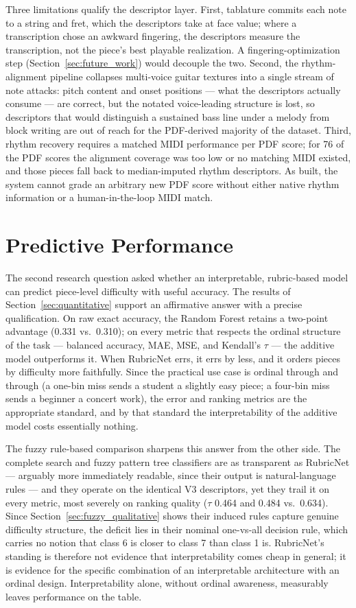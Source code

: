 Three limitations qualify the descriptor layer. First, tablature commits each note to a string and fret, which the descriptors take at face value; where a transcription chose an awkward fingering, the descriptors measure the transcription, not the piece's best playable realization. A fingering-optimization step (Section~\ref{sec:future_work}) would decouple the two. Second, the rhythm-alignment pipeline collapses multi-voice guitar textures into a single stream of note attacks: pitch content and onset positions --- what the descriptors actually consume --- are correct, but the notated voice-leading structure is lost, so descriptors that would distinguish a sustained bass line under a melody from block writing are out of reach for the PDF-derived majority of the dataset. Third, rhythm recovery requires a matched MIDI performance per PDF score; for 76 of the PDF scores the alignment coverage was too low or no matching MIDI existed, and those pieces fall back to median-imputed rhythm descriptors. As built, the system cannot grade an arbitrary new PDF score without either native rhythm information or a human-in-the-loop MIDI match.

\section{Predictive Performance}
\label{sec:disc_performance}
The second research question asked whether an interpretable, rubric-based model can predict piece-level difficulty with useful accuracy. The results of Section~\ref{sec:quantitative} support an affirmative answer with a precise qualification. On raw exact accuracy, the Random Forest retains a two-point advantage (0.331 vs.\ 0.310); on every metric that respects the ordinal structure of the task --- balanced accuracy, MAE, MSE, and Kendall's $\tau$ --- the additive model outperforms it. When RubricNet errs, it errs by less, and it orders pieces by difficulty more faithfully. Since the practical use case is ordinal through and through (a one-bin miss sends a student a slightly easy piece; a four-bin miss sends a beginner a concert work), the error and ranking metrics are the appropriate standard, and by that standard the interpretability of the additive model costs essentially nothing.

The fuzzy rule-based comparison sharpens this answer from the other side. The complete search and fuzzy pattern tree classifiers are as transparent as RubricNet --- arguably more immediately readable, since their output is natural-language rules --- and they operate on the identical V3 descriptors, yet they trail it on every metric, most severely on ranking quality ($\tau$ 0.464 and 0.484 vs.\ 0.634). Since Section~\ref{sec:fuzzy_qualitative} shows their induced rules capture genuine difficulty structure, the deficit lies in their nominal one-vs-all decision rule, which carries no notion that class 6 is closer to class 7 than class 1 is. RubricNet's standing is therefore not evidence that interpretability comes cheap in general; it is evidence for the specific combination of an interpretable architecture with an ordinal design. Interpretability alone, without ordinal awareness, measurably leaves performance on the table.

